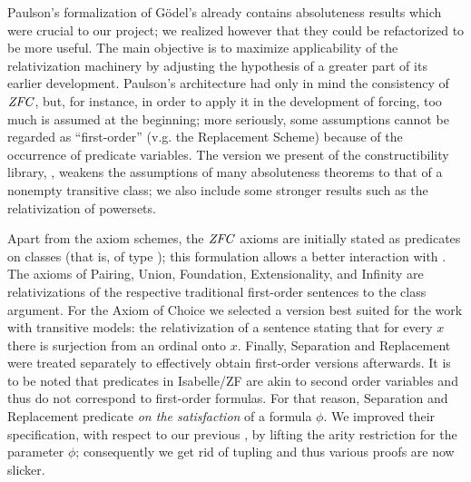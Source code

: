Paulson's formalization \cite{paulson_2003} of Gödel's \cite{godel-L}
already contains absoluteness results which were crucial to our
project; we realized however that they could be refactorized to be
more useful. The main objective is to maximize applicability of
the relativization machinery by adjusting the hypothesis of a greater
part of its earlier development. Paulson's architecture had only in mind
the consistency of $\mathit{ZFC}$, but, for instance, in order to apply it in
the development of forcing, too much is assumed at the beginning; more
seriously, some assumptions cannot be regarded as ``first-order''
(v.g. the Replacement Scheme) because of the occurrence of predicate
variables.
The version we present of the constructibility library,
, weakens the
assumptions of many absoluteness theorems to that
of a nonempty transitive class; we also include some stronger results
such as the relativization of powersets.

Apart from the axiom schemes, the $\mathit{ZFC}$ axioms are initially stated
as predicates on classes (that is, of type
); this formulation
allows a better interaction with .  The axioms
of Pairing, Union, Foundation, Extensionality, and Infinity are
relativizations of the respective traditional first-order sentences to
the class argument. For the Axiom of Choice we selected a version best
suited for the work with transitive models: the relativization of a
sentence stating that for every $x$ there is surjection from an
ordinal onto $x$. Finally, Separation and Replacement were treated
separately to effectively obtain first-order versions afterwards. It
is to be noted that predicates in Isabelle/ZF are akin to second order
variables and thus do not correspond to first-order formulas.
For that reason, Separation and Replacement predicate \emph{on the
  satisfaction} of a formula $\phi$.  We improved their specification,
with respect to our previous \cite{2019arXiv190103313G}, by lifting
the arity restriction for the parameter $\phi$; consequently we
get rid of tupling and thus various proofs are now slicker.

